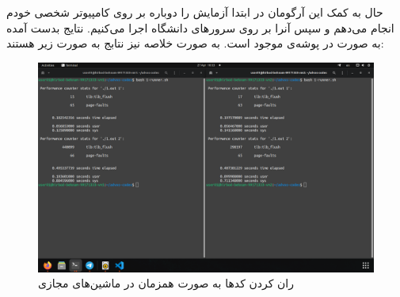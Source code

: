 حال به کمک این آرگومان در ابتدا آزمایش را دوباره بر روی کامپیوتر شخصی خودم
انجام می‌دهم و سپس آنرا بر روی سرور‌های دانشگاه اجرا می‌کنیم.
نتایج بدست آمده به صورت
در پوشه‌ی
موجود است. به صورت خلاصه نیز نتابج به صورت زیر هستند:
\begin{figure}[H]
    \centering
    \includegraphics[scale=0.25]{pic/1-vm.png}
    \caption{ران کردن کد‌ها به صورت همزمان در ماشین‌های مجازی}
\end{figure}
